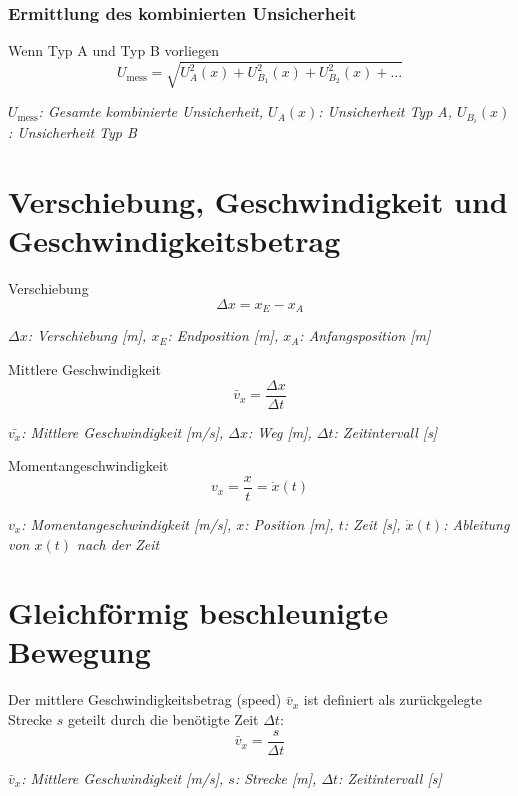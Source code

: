 \documentclass[a5paper,10pt]{article}
\newenvironment{displayformula}
{
	\begin{framed}
		\color{formulaColor}
	}
	{\end{framed}}
\newcommand{\formulalegend}[1]{%
	\par\vspace{0.5ex}%
	{{\color{legendColor}\RaggedRight\small\textit{#1}}}%
	\par\vspace{1.5ex}%
}
\begin{document}
	\subsubsection{Ermittlung des kombinierten Unsicherheit}
	
	\begin{displayformula}
		Wenn Typ A und Typ B vorliegen
		\[
		U_\text{mess} = \sqrt{U^2_A(x) + U^2_{B_1}(x) + U^2_{B_2}(x) + \dots}
		\]
	\end{displayformula}
	\formulalegend{
		\( U_\text{mess} \): Gesamte kombinierte Unsicherheit, \( U_A(x) \): Unsicherheit Typ A, \( U_{B_i}(x) \): Unsicherheit Typ B
	}
	
	\newpage
	
\section{Verschiebung, Geschwindigkeit und \\Geschwindigkeitsbetrag}

\begin{displayformula}
	Verschiebung
	\[
	\Delta x = x_E - x_A
	\]
\end{displayformula}
\formulalegend{
	\( \Delta x \): Verschiebung [m], \( x_E \): Endposition [m], \( x_A \): Anfangsposition [m]
}

\begin{displayformula}
	Mittlere Geschwindigkeit
	\[
	\bar{v}_x = \frac{\Delta x}{\Delta t}
	\]
\end{displayformula}
\formulalegend{
	\( \bar{v_x} \): Mittlere Geschwindigkeit [m/s], \( \Delta x \): Weg [m], \( \Delta t \): Zeitintervall [s]
}

\begin{displayformula}
	Momentangeschwindigkeit
	\[
	v_x = \dfrac{x}{t} = \dot{x} (t)
	\]
\end{displayformula}
\formulalegend{
	\( v_x \): Momentangeschwindigkeit [m/s], \( x \): Position [m], \( t \): Zeit [s], \( \dot{x}(t) \): Ableitung von \( x(t) \) nach der Zeit
}

\newpage

\section{Gleichförmig beschleunigte Bewegung}

\begin{displayformula}
	Der mittlere Geschwindigkeitsbetrag (speed) \( \bar{v}_x \) ist definiert als zurückgelegte Strecke \( s \) geteilt durch die benötigte Zeit \( \Delta t \):
	\[
	\bar{v}_x = \frac{s}{\Delta t}
	\]
\end{displayformula}
\formulalegend{
	\( \bar{v}_x \): Mittlere Geschwindigkeit [m/s], \( s \): Strecke [m], \( \Delta t \): Zeitintervall [s]
}
\end{document}
